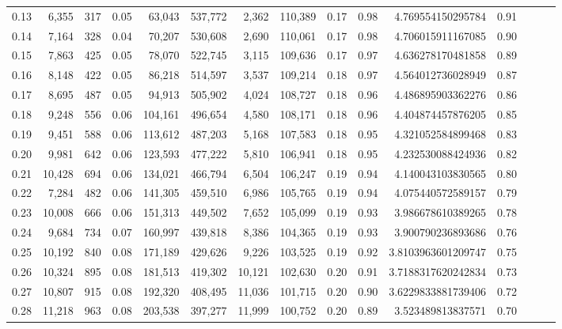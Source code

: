 \begin{tabular}{rrrrrrrrrrrrrrr}
0.13 &   6,355 &    317 &  0.05 &   63,043 &  537,772 &    2,362 &  110,389 &  0.17 &  0.98 &     4.769554150295784 &      0.91 \\
0.14 &   7,164 &    328 &  0.04 &   70,207 &  530,608 &    2,690 &  110,061 &  0.17 &  0.98 &     4.706015911167085 &      0.90 \\
0.15 &   7,863 &    425 &  0.05 &   78,070 &  522,745 &    3,115 &  109,636 &  0.17 &  0.97 &     4.636278170481858 &      0.89 \\
0.16 &   8,148 &    422 &  0.05 &   86,218 &  514,597 &    3,537 &  109,214 &  0.18 &  0.97 &     4.564012736028949 &      0.87 \\
0.17 &   8,695 &    487 &  0.05 &   94,913 &  505,902 &    4,024 &  108,727 &  0.18 &  0.96 &     4.486895903362276 &      0.86 \\
0.18 &   9,248 &    556 &  0.06 &  104,161 &  496,654 &    4,580 &  108,171 &  0.18 &  0.96 &     4.404874457876205 &      0.85 \\
0.19 &   9,451 &    588 &  0.06 &  113,612 &  487,203 &    5,168 &  107,583 &  0.18 &  0.95 &     4.321052584899468 &      0.83 \\
0.20 &   9,981 &    642 &  0.06 &  123,593 &  477,222 &    5,810 &  106,941 &  0.18 &  0.95 &     4.232530088424936 &      0.82 \\
0.21 &  10,428 &    694 &  0.06 &  134,021 &  466,794 &    6,504 &  106,247 &  0.19 &  0.94 &     4.140043103830565 &      0.80 \\
0.22 &   7,284 &    482 &  0.06 &  141,305 &  459,510 &    6,986 &  105,765 &  0.19 &  0.94 &     4.075440572589157 &      0.79 \\
0.23 &  10,008 &    666 &  0.06 &  151,313 &  449,502 &    7,652 &  105,099 &  0.19 &  0.93 &     3.986678610389265 &      0.78 \\
0.24 &   9,684 &    734 &  0.07 &  160,997 &  439,818 &    8,386 &  104,365 &  0.19 &  0.93 &     3.900790236893686 &      0.76 \\
0.25 &  10,192 &    840 &  0.08 &  171,189 &  429,626 &    9,226 &  103,525 &  0.19 &  0.92 &    3.8103963601209747 &      0.75 \\
0.26 &  10,324 &    895 &  0.08 &  181,513 &  419,302 &   10,121 &  102,630 &  0.20 &  0.91 &    3.7188317620242834 &      0.73 \\
0.27 &  10,807 &    915 &  0.08 &  192,320 &  408,495 &   11,036 &  101,715 &  0.20 &  0.90 &    3.6229833881739406 &      0.72 \\
0.28 &  11,218 &    963 &  0.08 &  203,538 &  397,277 &   11,999 &  100,752 &  0.20 &  0.89 &     3.523489813837571 &      0.70 \\

\end{tabular}
